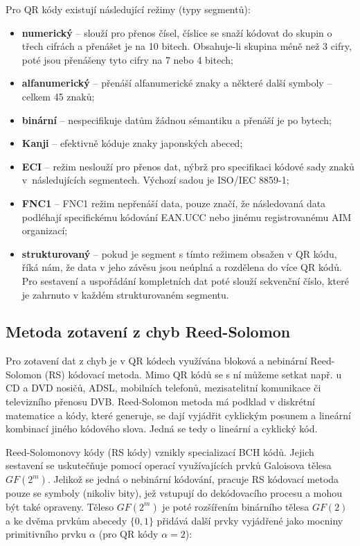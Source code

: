 \bigskip \noindent Pro QR kódy existují následující režimy (typy segmentů): 
\begin{itemize}
  \item \textbf{numerický} -- slouží pro přenos čísel, číslice se snaží kódovat
 do skupin o třech cifrách a přenášet je na 10 bitech. Obsahuje-li skupina méně 
 než 3 cifry, poté jsou přenášeny tyto cifry na 7 nebo 4 bitech;
  \item \textbf{alfanumerický} -- přenáší alfanumerické znaky a některé další 
  symboly -- celkem 45 znaků;
  \item \textbf{binární} -- nespecifikuje datům žádnou sémantiku a přenáší je po
  bytech;
  \item \textbf{Kanji} -- efektivně kóduje znaky japonských abeced;
  \item \textbf{ECI} -- režim neslouží pro přenos dat, nýbrž pro specifikaci
  kódové sady znaků v~následujících segmentech. Výchozí sadou je ISO/IEC 8859-1;
  \item \textbf{FNC1} -- FNC1 režim nepřenáší data, pouze značí, že následovaná
  data podléhají specifickému kódování EAN.UCC nebo jinému registrovanému AIM
  organizací;
  \item \textbf{strukturovaný} -- pokud je segment s tímto režimem obsažen v QR 
  kódu, říká nám, že data v jeho závěsu jsou neúplná a rozdělena do více QR 
  kódů. Pro sestavení a uspořádání kompletních dat poté slouží sekvenční 
  číslo, které je zahrnuto v každém strukturovaném segmentu.
\end{itemize}

\subsection{Metoda zotavení z chyb Reed-Solomon}
\label{metodaReedSolomon}

Pro zotavení dat z chyb je v QR kódech využívána bloková a nebinární
Reed-Solomon (RS) kódovací metoda. Mimo QR kódů se s ní můžeme setkat např. u 
 CD a DVD nosičů, ADSL, mobilních telefonů, mezisatelitní komunikace či 
televizního přenosu DVB. Reed-Solomon metoda má podklad v diskrétní matematice 
a kódy, které generuje, se dají vyjádřit cyklickým posunem a lineární kombinací
jiného kódového slova. Jedná se tedy o lineární a cyklický kód.

Reed-Solomonovy kódy (RS kódy) vznikly specializací BCH kódů. Jejich sestavení
se uskutečňuje pomocí operací využívajících prvků Galoisova tělesa $GF(2^m)$. 
Jelikož se jedná o nebinární kódování, pracuje RS kódovací metoda pouze se 
symboly (nikoliv bity), jež vstupují do dekódovacího procesu a mohou být také 
opraveny. Těleso $GF(2^m)$ je poté rozšířením binárního tělesa $GF(2)$ a ke
dvěma prvkům abecedy $\{0,1\}$ přidává další prvky vyjádřené jako mocniny
primitivního prvku $\alpha$ (pro QR kódy $\alpha = 2$): 

